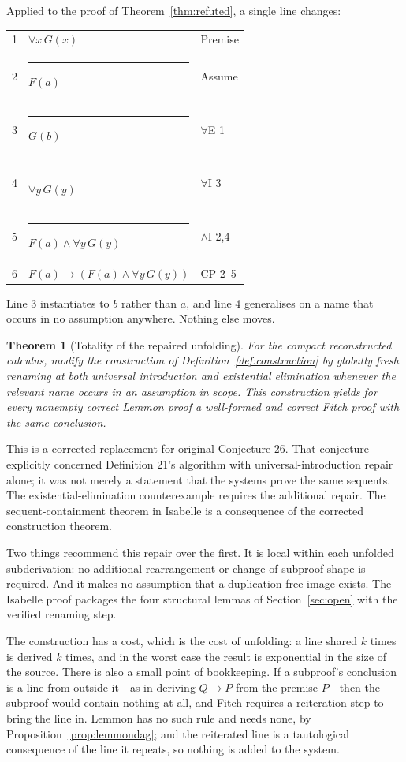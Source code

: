 \documentclass[11pt]{article}
\makeatletter
\theoremstyle{plain}
\newtheorem{theorem}{Theorem}
\theoremstyle{definition}
\theoremstyle{remark}
\newcommand{\fbar}{\rule[-0.7ex]{0.4pt}{2.6ex}\hspace{0.7em}}
\newenvironment{fitchproof}
  {\begin{center}\begin{tabular}{@{}r@{\hspace{1em}}l@{\hspace{2.5em}}l@{}}}
  {\end{tabular}\end{center}}
\makeatother
\begin{document}
Applied to the proof of Theorem~\ref{thm:refuted}, a single line changes:

\begin{fitchproof}
1 &                 $\forall x\, G(x)$ & Premise \\
2 & \fbar           $F(a)$             & Assume \\
3 & \fbar           $G(b)$             & $\forall$E 1 \\
4 & \fbar           $\forall y\, G(y)$ & $\forall$I 3 \\
5 & \fbar           $F(a) \wedge \forall y\, G(y)$ & $\wedge$I 2,4 \\
6 &                 $F(a) \to (F(a) \wedge \forall y\, G(y))$ & CP 2--5 \\
\end{fitchproof}

\noindent Line 3 instantiates to $b$ rather than $a$, and line 4 generalises
on a name that occurs in no assumption anywhere. Nothing else moves.

\begin{theorem}[Totality of the repaired unfolding]\label{conj:total}
For the compact reconstructed calculus, modify the construction of
Definition~\ref{def:construction} by globally fresh renaming at both universal
introduction and existential elimination whenever the relevant name occurs in
an assumption in scope. This construction yields for every nonempty correct
Lemmon proof a well-formed and correct Fitch proof with the same conclusion.
\end{theorem}

This is a corrected replacement for original Conjecture 26. That conjecture
explicitly concerned Definition 21's algorithm with universal-introduction
repair alone; it was not merely a statement that the systems prove the same
sequents. The existential-elimination counterexample requires the additional
repair. The sequent-containment theorem in Isabelle is a consequence of the
corrected construction theorem.

Two things recommend this repair over the first. It is local within each
unfolded subderivation: no additional rearrangement or change of subproof shape
is required. And it makes no assumption that a duplication-free image exists.
The Isabelle proof packages the four structural lemmas of
Section~\ref{sec:open} with the verified renaming step.

The construction has a cost, which is the cost of unfolding: a line shared $k$
times is derived $k$ times, and in the worst case the result is exponential in
the size of the source. There is also a small point of bookkeeping. If a
subproof's conclusion is a line from outside it---as in deriving $Q \to P$
from the premise $P$---then the subproof would contain nothing at all, and
Fitch requires a reiteration step to bring the line in. Lemmon has no such
rule and needs none, by Proposition~\ref{prop:lemmondag}; and the reiterated
line is a tautological consequence of the line it repeats, so nothing is added
to the system.
\end{document}

